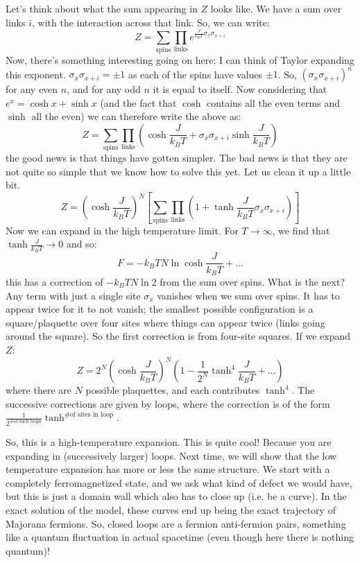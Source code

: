 Let's think about what the sum appearing in $Z$ looks like. We have a sum over links $i$, with the interaction across that link. So, we can write:
\begin{equation}
    Z = \sum_{\text{spins}}\prod_{\text{links}}e^{\frac{J}{k_B T}\sigma_x\sigma_{x+i}}
\end{equation}
Now, there's something interesting going on here; I can think of Taylor expanding this exponent. $\sigma_x\sigma_{x+i} = \pm 1$ as each of the spins have values $\pm 1$. So, $(\sigma_x \sigma_{x+i})^{n}$ for any even $n$, and for any odd $n$ it is equal to itself. Now considering that $e^x = \cosh x + \sinh x$ (and the fact that $\cosh$ contains all the even terms and $\sinh$ all the even) we can therefore write the above as:
\begin{equation}
    Z = \sum_{\text{spins}}\prod_{\text{links}}\left(\cosh\frac{J}{k_B T} + \sigma_x\sigma_{x+i}\sinh\frac{J}{k_B T}\right)
\end{equation}
the good news is that things have gotten simpler. The bad news is that they are not quite so simple that we know how to solve this yet. Let us clean it up a little bit.
\begin{equation}
    Z = \left(\cosh\frac{J}{k_B T}\right)^N\left[\sum_{\text{spins}}\prod_{\text{links}}(1 + \tanh\frac{J}{k_B T}\sigma_x\sigma_{x+i})\right]
\end{equation}
Now we can expand in the high temperature limit. For $T \to \infty$, we find that $\tanh\frac{J}{k_B T} \to 0$ and so:
\begin{equation}
    F = -k_B T N\ln \cosh\frac{J}{k_B T} + \ldots 
\end{equation}
this has a correction of $-k_B T N \ln 2$ from the sum over spins. What is the next? Any term with just a single site $\sigma_x$ vanishes when we sum over spins. It has to appear twice for it to not vanish; the smallest possible configuration is a square/plaquette over four sites where things can appear twice (links going around the square). So the first correction is from four-site squares. If we expand $Z$:
\begin{equation}
    Z = 2^N\left(\cosh\frac{J}{k_B T}\right)^N\left(1 - \frac{1}{2^N}\tanh^4\frac{J}{k_B T} + \ldots \right)
\end{equation}
where there are $N$ possible plaquettes, and each contributes $\tanh^4$. The successive corrections are given by loops, where the correction is of the form $\frac{1}{2^{\# \text{of such loops}}}\tanh^{\text{\# of sites in loop}}$.

So, this is a high-temperature expansion. This is quite cool! Because you are expanding in (successively larger) loops. Next time, we will show that the low temperature expansion has more or less the same structure. We start with a completely ferromagnetized state, and we ask what kind of defect we would have, but this is just a domain wall which also has to close up (i.e. be a curve). In the exact solution of the model, these curves end up being the exact trajectory of Majorana fermions. So, closed loops are a fermion anti-fermion pairs, something like a quantum fluctuation in actual spacetime (even though here there is nothing quantum)!